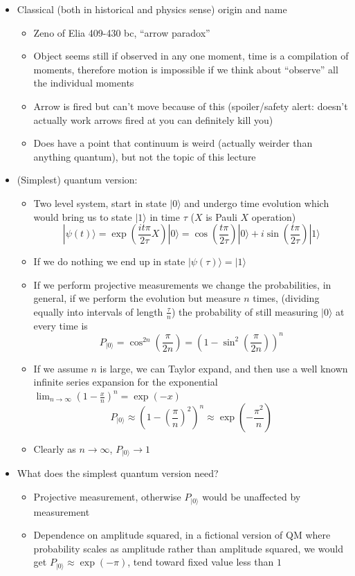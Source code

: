 \documentclass[english]{article}
\newcommand{\ket}[1]{|#1 \rangle}
\begin{document}
\begin{itemize}
\item Classical (both in historical and physics sense) origin and name 
\begin{itemize}
\item Zeno of Elia 409-430 bc, ``arrow paradox''
\item Object seems still if observed in any one moment,  time is a compilation of moments, therefore motion is impossible if we think about ``observe'' all the individual moments
\item Arrow is fired but can't move because of this (spoiler/safety alert: doesn't actually work arrows fired at you can definitely kill you)
\item Does have a point that continuum is weird (actually weirder than anything quantum), but not the topic of this lecture
\end{itemize}
\item (Simplest) quantum version:
\begin{itemize}
\item Two level system, start in state $\ket{0}$ and undergo time evolution which would bring us to state $\ket{1}$ in time $\tau$ ($X$ is Pauli $X$ operation)
\begin{equation}
\ket{\psi(t)}=\exp\left(\frac{i t \pi }{2 \tau} X\right)\ket{0}=\cos(\frac{ t \pi }{2 \tau})\ket{0}+i \sin(\frac{ t \pi }{2 \tau})\ket{1}
\end{equation}
\item If we do nothing we end up in state $\ket{\psi(\tau)}=\ket{1}$
\item If we perform projective measurements we change the probabilities, in general, if we perform the evolution but measure $n$ times, (dividing equally into intervals of length $\frac{\tau}{n}$) the probability of still measuring $\ket{0}$ at every time is
\begin{equation}
P_{\ket{0}}=\cos^{2n}(\frac{  \pi }{2 n})=(1-\sin^2(\frac{ \pi }{2n}))^n
\end{equation}
\item If we assume $n$ is large, we can Taylor expand, and then use a well known infinite series expansion for the exponential $\lim_{n\rightarrow \infty}(1-\frac{x}{n})^n=\exp(-x)$
\begin{equation}
P_{\ket{0}}\approx(1-(\frac{ \pi }{n})^2)^n\approx \exp(-\frac{ \pi ^2}{n})
\end{equation}
\item Clearly as $n\rightarrow \infty$, $P_{\ket{0}} \rightarrow 1$
\end{itemize}
\item What does the simplest quantum version need?
\begin{itemize}
\item Projective measurement, otherwise $P_{\ket{0}}$ would be unaffected by measurement
\item Dependence on amplitude squared, in a fictional version of QM where probability scales as amplitude rather than amplitude squared, we would get $P_{\ket{0}}\approx \exp(- \pi)$, tend toward fixed value less than $1$
\end{itemize}
\end{itemize}
\end{document}
